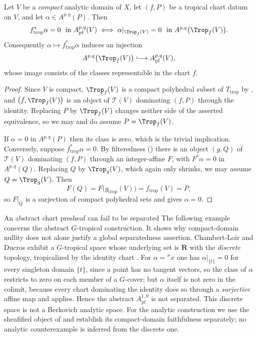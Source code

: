 \begin{proposition}
\label{prop:ch13-nullity}
Let $V$ be a \emph{compact} analytic domain of $X$, let $(f,P)$ be a
tropical chart datum on $V$, and let $\alpha\in A^{p,q}(P)$.  Then
\[
 f_{\mathrm{trop}}^*\alpha=0\ \text{ in }A^{p,q}_{\mathrm{pf}}(V)
 \iff
 \alpha|_{\Trop_f(V)}=0\ \text{ in }A^{p,q}\bigl(\Trop_f(V)\bigr).
\]
Consequently $\alpha\mapsto f_{\mathrm{trop}}^*\alpha$ induces an injection
\[
 A^{p,q}\bigl(\Trop_f(V)\bigr)\lhook\joinrel\longrightarrow
 A^{p,q}_{\mathrm{pf}}(V),
\]
whose image consists of the classes representable in the chart $f$.
\end{proposition}

\begin{proof}
Since $V$ is compact, $\Trop_f(V)$ is a compact polyhedral subset of
$T_{\mathrm{trop}}$ by , and
$\bigl(f,\Trop_f(V)\bigr)$ is an object of $\mathscr T(V)$ dominating
$(f,P)$ through the identity.  Replacing $P$ by $\Trop_f(V)$ changes neither
side of the asserted equivalence, so we may and do assume
$P=\Trop_f(V)$.

If $\alpha=0$ in $A^{p,q}(P)$ then its class is zero, which is the trivial
implication.  Conversely, suppose $f_{\mathrm{trop}}^*\alpha=0$.  By
filteredness () there is an object $(g,Q)$ of
$\mathscr T(V)$ dominating $(f,P)$ through an integer-affine $F$, with
$F^*\alpha=0$ in $A^{p,q}(Q)$.  Replacing $Q$ by $\Trop_g(V)$, which again
only shrinks, we may assume $Q=\Trop_g(V)$.  Then
\[
 F(Q)=F\bigl(g_{\mathrm{trop}}(V)\bigr)=f_{\mathrm{trop}}(V)=P,
\]
so $F|_Q$ is a surjection of compact polyhedral sets and
 gives $\alpha=0$.
\end{proof}

\begin{warning}{An abstract chart presheaf can fail to be separated}
The following example concerns the abstract $G$-tropical construction.
It shows why compact-domain nullity does not alone justify a global
separatedness assertion.  Chambert-Loir and Ducros exhibit a
$G$-tropical space whose underlying set is $\mathbf R$ with the
\emph{discrete} topology, tropicalized by the identity chart
\cite[Remark~3.4.3]{CLD25}.  For $\alpha=\dprime x$ one has
$\alpha|_{\{t\}}=0$ for every singleton domain $\{t\}$, since a point has no
tangent vectors, so the class of $\alpha$ restricts to zero on each member of
a $G$-cover; but $\alpha$ itself is not zero in the colimit, because every
chart dominating the identity does so through a \emph{surjective} affine map
and  applies.  Hence the
abstract $A^{1,0}_{\mathrm{pf}}$ is not separated.  This discrete
space is not a Berkovich analytic space.  For the analytic construction we
use the sheafified object of  and establish its
compact-domain faithfulness separately; no analytic counterexample is
inferred from the discrete one.
\end{warning}

